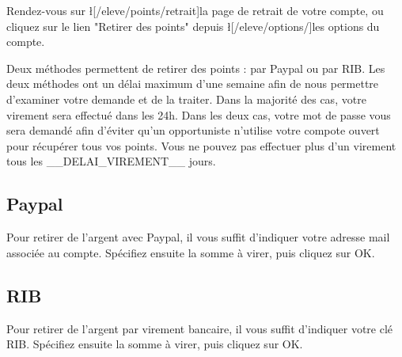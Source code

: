 ﻿Rendez-vous sur \l[/eleve/points/retrait]{la page de retrait} de votre compte, ou cliquez sur le lien "Retirer des points" depuis \l[/eleve/options/]{les options du compte}.

Deux méthodes permettent de retirer des points : par Paypal ou par RIB.
Les deux méthodes ont un délai maximum d'une semaine afin de nous permettre d'examiner votre demande et de la traiter. Dans la majorité des cas, votre virement sera effectué dans les 24h.
Dans les deux cas, votre mot de passe vous sera demandé afin d'éviter qu'un opportuniste n'utilise votre compote ouvert pour récupérer tous vos points.
Vous ne pouvez pas effectuer plus d'un virement tous les __DELAI_VIREMENT__ jours.

\subsection{Paypal}
Pour retirer de l'argent avec Paypal, il vous suffit d'indiquer votre adresse mail associée au compte.
Spécifiez ensuite la somme à virer, puis cliquez sur OK.

\subsection{RIB}
Pour retirer de l'argent par virement bancaire, il vous suffit d'indiquer votre clé RIB.
Spécifiez ensuite la somme à virer, puis cliquez sur OK.